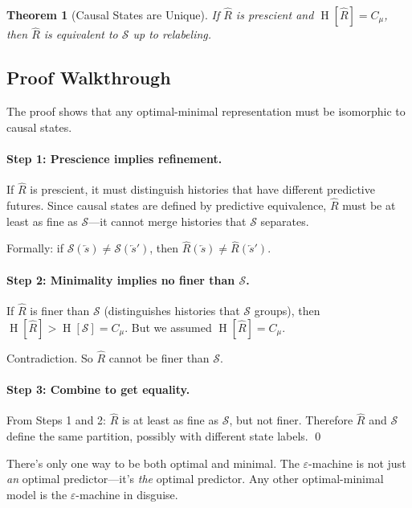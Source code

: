 \documentclass[11pt,a4paper]{article}
\theoremstyle{definition}
\theoremstyle{plain}
\newtheorem{theorem}{Theorem}[section]
\newcommand{\eps}{\varepsilon}
\newcommand{\Cmu}{C_\mu}
\newcommand{\calS}{\mathcal{S}}
\newcommand{\past}{\overleftarrow{s}}
\DeclareMathOperator{\Ent}{H}
\begin{document}
\begin{theorembox}[title=Theorem 3: Uniqueness~\cite{shalizi2001computational}]
\begin{theorem}[Causal States are Unique]
\label{thm:uniqueness}
If $\hat{R}$ is prescient and $\Ent[\hat{R}] = \Cmu$, then $\hat{R}$ is equivalent to $\calS$ up to relabeling.
\end{theorem}
\end{theorembox}

\subsection{Proof Walkthrough}

The proof shows that any optimal-minimal representation must be isomorphic to causal states.

\paragraph{Step 1: Prescience implies refinement.}
If $\hat{R}$ is prescient, it must distinguish histories that have different predictive futures. Since causal states are defined by predictive equivalence, $\hat{R}$ must be at least as fine as $\calS$---it cannot merge histories that $\calS$ separates.

Formally: if $\calS(\past) \neq \calS(\past')$, then $\hat{R}(\past) \neq \hat{R}(\past')$.

\paragraph{Step 2: Minimality implies no finer than $\calS$.}
If $\hat{R}$ is finer than $\calS$ (distinguishes histories that $\calS$ groups), then $\Ent[\hat{R}] > \Ent[\calS] = \Cmu$. But we assumed $\Ent[\hat{R}] = \Cmu$.

Contradiction. So $\hat{R}$ cannot be finer than $\calS$.

\paragraph{Step 3: Combine to get equality.}
From Steps 1 and 2: $\hat{R}$ is at least as fine as $\calS$, but not finer. Therefore $\hat{R}$ and $\calS$ define the same partition, possibly with different state labels. \qed

\begin{intuition}
There's only one way to be both optimal and minimal. The $\eps$-machine is not just \emph{an} optimal predictor---it's \emph{the} optimal predictor. Any other optimal-minimal model is the $\eps$-machine in disguise.
\end{intuition}
\end{document}
